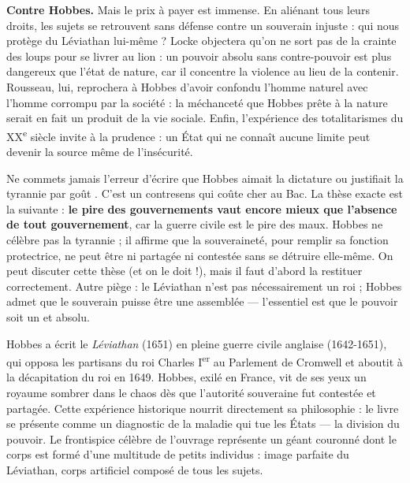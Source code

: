 \documentclass[11pt]{article}
\begin{document}
\textbf{Contre Hobbes.} Mais le prix à payer est immense. En aliénant tous leurs droits, les sujets se retrouvent sans défense contre un souverain injuste : qui nous protège du Léviathan lui-même ? Locke objectera qu'on ne sort pas de la crainte des loups pour se livrer au lion : un pouvoir absolu sans contre-pouvoir est plus dangereux que l'état de nature, car il concentre la violence au lieu de la contenir. Rousseau, lui, reprochera à Hobbes d'avoir confondu l'homme naturel avec l'homme corrompu par la société : la méchanceté que Hobbes prête à la nature serait en fait un produit de la vie sociale. Enfin, l'expérience des totalitarismes du XX\textsuperscript{e} siècle invite à la prudence : un État qui ne connaît aucune limite peut devenir la source même de l'insécurité.

\begin{attention}
Ne commets jamais l'erreur d'écrire que Hobbes \guillemotleft aimait la dictature \guillemotright ou \guillemotleft justifiait la tyrannie par goût \guillemotright. C'est un contresens qui coûte cher au Bac. La thèse exacte est la suivante : \textbf{le pire des gouvernements vaut encore mieux que l'absence de tout gouvernement}, car la guerre civile est le pire des maux. Hobbes ne célèbre pas la tyrannie ; il affirme que la souveraineté, pour remplir sa fonction protectrice, ne peut être ni partagée ni contestée sans se détruire elle-même. On peut discuter cette thèse (et on le doit !), mais il faut d'abord la restituer correctement. Autre piège : le Léviathan n'est pas nécessairement un roi ; Hobbes admet que le souverain puisse être une assemblée — l'essentiel est que le pouvoir soit un et absolu.
\end{attention}

\begin{savaistu}
Hobbes a écrit le \emph{Léviathan} (1651) en pleine guerre civile anglaise (1642-1651), qui opposa les partisans du roi Charles I\textsuperscript{er} au Parlement de Cromwell et aboutit à la décapitation du roi en 1649. Hobbes, exilé en France, vit de ses yeux un royaume sombrer dans le chaos dès que l'autorité souveraine fut contestée et partagée. Cette expérience historique nourrit directement sa philosophie : le livre se présente comme un diagnostic de la maladie qui tue les États — la division du pouvoir. Le frontispice célèbre de l'ouvrage représente un géant couronné dont le corps est formé d'une multitude de petits individus : image parfaite du Léviathan, corps artificiel composé de tous les sujets.
\end{savaistu}
\end{document}
